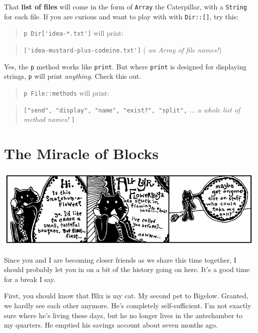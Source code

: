 \documentclass[10pt,twoside]{report}
\begin{document}
That {\bf list of files} will come in the form of
\lstinline[breaklines=true]|Array| the Caterpillar, with a
\lstinline[breaklines=true]|String| for each file.  If you are curious
and want to play with with \lstinline[breaklines=true]|Dir::[]|, try
this:

\begin{quote}
\lstinline[breaklines=true]|p Dir['idea-*.txt']| will
print:\end{quote}


\begin{quote}
\lstinline[breaklines=true]|['idea-mustard-plus-codeine.txt']| ({\em
  an Array of file names!})\end{quote}


Yes, the \lstinline[breaklines=true]|p| method works like
\lstinline[breaklines=true]|print|.  But where
\lstinline[breaklines=true]|print| is designed for displaying strings,
\lstinline[breaklines=true]|p| will print {\em anything}.  Check this
out.

\begin{quote}
\lstinline[breaklines=true]|p File::methods| will print:\end{quote}


\begin{quote}
\lstinline[breaklines=true]|["send", "display", "name", "exist?", "split",|
 ... {\em a whole list of method names!}
  \lstinline[breaklines=true]|]|\end{quote}



\section{The Miracle of Blocks}


	\includegraphics[width=1.0\textwidth]{cache/30.png}

Since you and I are becoming closer friends as we share this time
together, I should probably let you in on a bit of the history going
on here.  It's a good time for a break I say.

First, you should know that Blix is my cat.  My second pet to
Bigelow. Granted, we hardly see each other anymore.  He's completely
self-sufficient. I'm not exactly sure where he's living these days,
but he no longer lives in the antechamber to my quarters.  He emptied
his savings account about seven months ago.
\end{document}

